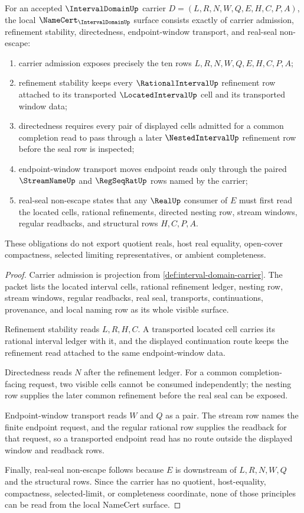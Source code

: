 \begin{theorem}
\label{thm:interval-domain-namecert-obligations}
For an accepted $\IntervalDomainUp$ carrier $D=(L,R,N,W,Q,E,H,C,P,A)$, the local $\NameCert_{\IntervalDomainUp}$ surface consists exactly of carrier admission, refinement stability, directedness, endpoint-window transport, and real-seal non-escape:
\begin{enumerate}
\item carrier admission exposes precisely the ten rows $L,R,N,W,Q,E,H,C,P,A$;
\item refinement stability keeps every $\RationalIntervalUp$ refinement row attached to its transported $\LocatedIntervalUp$ cell and its transported window data;
\item directedness requires every pair of displayed cells admitted for a common completion read to pass through a later $\NestedIntervalUp$ refinement row before the seal row is inspected;
\item endpoint-window transport moves endpoint reads only through the paired $\StreamNameUp$ and $\RegSeqRatUp$ rows named by the carrier;
\item real-seal non-escape states that any $\RealUp$ consumer of $E$ must first read the located cells, rational refinements, directed nesting row, stream windows, regular readbacks, and structural rows $H,C,P,A$.
\end{enumerate}
These obligations do not export quotient reals, host real equality, open-cover compactness, selected limiting representatives, or ambient completeness.
\end{theorem}
\begin{proof}
Carrier admission is projection from \autoref{def:interval-domain-carrier}. The packet lists the located interval cells, rational refinement ledger, nesting row, stream windows, regular readbacks, real seal, transports, continuations, provenance, and local naming row as its whole visible surface.

Refinement stability reads $L,R,H,C$. A transported located cell carries its rational interval ledger with it, and the displayed continuation route keeps the refinement read attached to the same endpoint-window data.

Directedness reads $N$ after the refinement ledger. For a common completion-facing request, two visible cells cannot be consumed independently; the nesting row supplies the later common refinement before the real seal can be exposed.

Endpoint-window transport reads $W$ and $Q$ as a pair. The stream row names the finite endpoint request, and the regular rational row supplies the readback for that request, so a transported endpoint read has no route outside the displayed window and readback rows.

Finally, real-seal non-escape follows because $E$ is downstream of $L,R,N,W,Q$ and the structural rows. Since the carrier has no quotient, host-equality, compactness, selected-limit, or completeness coordinate, none of those principles can be read from the local NameCert surface.
\end{proof}

